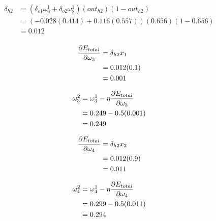 \documentclass[10pt,a4paper]{article}
\begin{document}
\begin{equation}
\begin{split}
\delta_{h2} &= (\delta_{o1}\omega_6^1 + \delta_{o2}\omega_8^1)(out_{h2})(1-out_{h2})\\
&= (-0.028(0.414) + 0.116(0.557))(0.656)(1-0.656)\\
&= 0.012\\
\end{split}
\end{equation}

\begin{equation}
\begin{split}
\pdv{E_{total}}{\omega_3} &= \delta_{h2}x_1\\ 
                          &= 0.012(0.1)\\
                          &= 0.001\\
\end{split}
\end{equation}

\begin{equation}
\begin{split}
\omega_3^2 &= \omega_3^1 - \eta\pdv{E_{total}}{\omega_3}\\
           &= 0.249 -0.5(0.001)\\
           &= 0.249\\
\end{split}
\end{equation}

\begin{equation}
\begin{split}
\pdv{E_{total}}{\omega_4} &= \delta_{h2}x_2\\ 
                          &= 0.012(0.9)\\
                          &= 0.011\\
\end{split}
\end{equation}

\begin{equation}
\begin{split}
\omega_4^2 &= \omega_4^1 - \eta\pdv{E_{total}}{\omega_4}\\
           &= 0.299 -0.5(0.011)\\
           &= 0.294\\
\end{split}
\end{equation}
\end{document}
